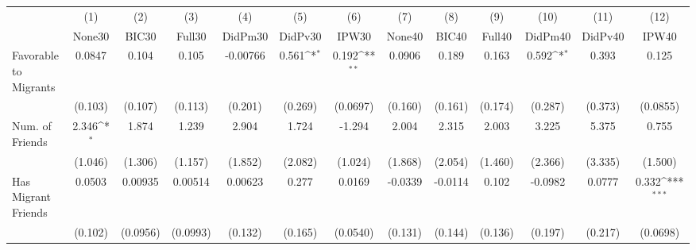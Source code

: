 {
\def\sym#1{\ifmmode^{#1}\else\(^{#1}\)\fi}
\begin{tabular}{l*{12}{c}}
\toprule
            &\multicolumn{1}{c}{(1)}&\multicolumn{1}{c}{(2)}&\multicolumn{1}{c}{(3)}&\multicolumn{1}{c}{(4)}&\multicolumn{1}{c}{(5)}&\multicolumn{1}{c}{(6)}&\multicolumn{1}{c}{(7)}&\multicolumn{1}{c}{(8)}&\multicolumn{1}{c}{(9)}&\multicolumn{1}{c}{(10)}&\multicolumn{1}{c}{(11)}&\multicolumn{1}{c}{(12)}\\
            &\multicolumn{1}{c}{None30}&\multicolumn{1}{c}{BIC30}&\multicolumn{1}{c}{Full30}&\multicolumn{1}{c}{DidPm30}&\multicolumn{1}{c}{DidPv30}&\multicolumn{1}{c}{IPW30}&\multicolumn{1}{c}{None40}&\multicolumn{1}{c}{BIC40}&\multicolumn{1}{c}{Full40}&\multicolumn{1}{c}{DidPm40}&\multicolumn{1}{c}{DidPv40}&\multicolumn{1}{c}{IPW40}\\
\midrule
Favorable to Migrants&      0.0847         &       0.104         &       0.105         &    -0.00766         &       0.561\sym{*}  &       0.192\sym{**} &      0.0906         &       0.189         &       0.163         &       0.592\sym{*}  &       0.393         &       0.125         \\
            &     (0.103)         &     (0.107)         &     (0.113)         &     (0.201)         &     (0.269)         &    (0.0697)         &     (0.160)         &     (0.161)         &     (0.174)         &     (0.287)         &     (0.373)         &    (0.0855)         \\
\addlinespace
Num. of Friends&       2.346\sym{*}  &       1.874         &       1.239         &       2.904         &       1.724         &      -1.294         &       2.004         &       2.315         &       2.003         &       3.225         &       5.375         &       0.755         \\
            &     (1.046)         &     (1.306)         &     (1.157)         &     (1.852)         &     (2.082)         &     (1.024)         &     (1.868)         &     (2.054)         &     (1.460)         &     (2.366)         &     (3.335)         &     (1.500)         \\
\addlinespace
Has Migrant Friends&      0.0503         &     0.00935         &     0.00514         &     0.00623         &       0.277         &      0.0169         &     -0.0339         &     -0.0114         &       0.102         &     -0.0982         &      0.0777         &       0.332\sym{***}\\
            &     (0.102)         &    (0.0956)         &    (0.0993)         &     (0.132)         &     (0.165)         &    (0.0540)         &     (0.131)         &     (0.144)         &     (0.136)         &     (0.197)         &     (0.217)         &    (0.0698)         \\

\end{tabular}}
